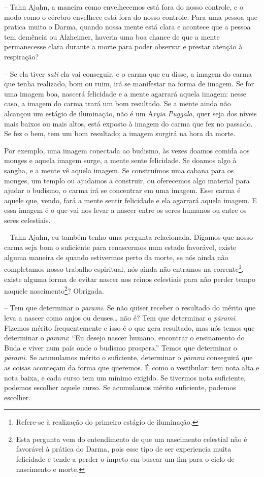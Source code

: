 -- Tahn Ajahn, a maneira como envelhecemos está fora do nosso
controle, e o modo como o cérebro envelhece está fora do nosso
controle. Para uma pessoa que pratica muito o Darma, quando nossa mente
está clara e acontece que a pessoa tem demência ou Alzheimer, haveria
uma boa chance de que a mente permanecesse clara durante a morte para
poder observar e prestar atenção à respiração?

-- Se ela tiver \textit{sati} ela vai conseguir, e o carma que eu
disse, a imagem do carma que tenha realizado, bom ou ruim, irá se
manifestar na forma de imagem. Se for uma imagem boa, nascerá
felicidade e a mente agarrará aquela imagem: nesse caso, a imagem do
carma trará um bom resultado. Se a mente ainda não alcançou um estágio
de iluminação, não é um A\textit{ryia Puggala}, quer seja dos níveis
mais baixos ou mais altos, está exposto à imagem do carma que fez no
passado. Se fez o bem, tem um bom resultado; a imagem surgirá na hora
da morte.

Por exemplo, uma imagem conectada ao budismo, às vezes doamos comida
aos monges e aquela imagem surge, a mente sente felicidade. Se doamos
algo à sangha, e a mente vê aquela imagem. Se construímos uma cabana
para os monges, um templo ou ajudamos a construir, ou oferecemos algo
material para ajudar o budismo, o carma irá se concentrar em uma
imagem. Esse carma é aquele que, vendo, fará a mente sentir felicidade
e ela agarrará aquela imagem. E essa imagem é o que vai nos levar a
nascer entre os seres humanos ou entre os seres celestiais.

-- Tahn Ajahn, eu também tenho uma pergunta relacionada. Digamos
que nosso carma seja bom o suficiente para renascermos num estado
favorável, existe alguma maneira de quando estivermos perto da morte,
se nós ainda não completamos nosso trabalho espiritual, nós ainda não
entramos na corrente\footnote{Refere-se à realização do primeiro
estágio de iluminação.}, existe alguma forma de evitar nascer nos
reinos celestiais para não perder tempo naquele
nascimento\footnote{Esta pergunta vem do entendimento de que um
nascimento celestial não é favorável à prática do Darma, pois esse tipo
de ser experiencia muita felicidade e tende a perder o ímpeto em buscar
um fim para o ciclo de nascimento e morte.}? Obrigada.

-- Tem que determinar o \textit{pāramī}. Se não quiser receber
o resultado do mérito que leva a nascer como anjos ou deuses…
não é? Tem que determinar o \textit{pāramī}. Fizemos mérito
frequentemente e isso é o que gera resultado, mas nós temos que
determinar o \textit{pāramī}: “Eu desejo nascer humano, encontrar
o ensinamento do Buda e viver num país onde o budismo prospera.” Temos
que determinar o \textit{pāramī}. Se acumulamos mérito o
suficiente, determinar o \textit{pāramī} conseguirá que as coisas
aconteçam da forma que queremos. É como o vestibular: tem nota alta e
nota baixa, e cada curso tem um mínimo exigido. Se tivermos nota
suficiente, podemos escolher aquele curso. Se acumulamos mérito
suficiente, podemos escolher.

